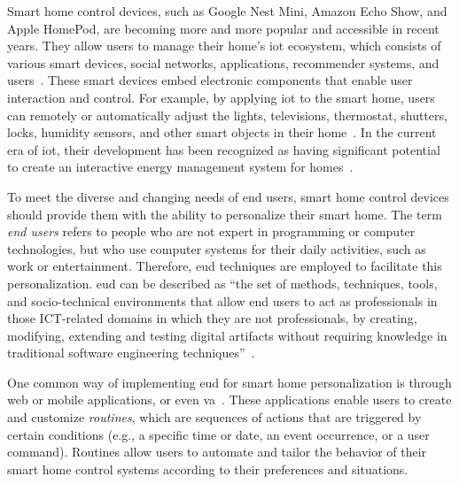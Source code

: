 Smart home control devices, such as Google Nest Mini, Amazon Echo Show, and Apple HomePod, are becoming more and more popular and accessible in recent years. They allow users to manage their home's \acrfull{iot} ecosystem, which consists of various smart devices, social networks, applications, recommender systems, and users~\parencite{barricelliDesigningEndUserDevelopment2015}. These smart devices embed electronic components that enable user interaction and control. For example, by applying \acrshort{iot} to the smart home, users can remotely or automatically adjust the lights, televisions, thermostat, shutters, locks, humidity sensors, and other smart objects in their home~\parencite{kortuemSmartObjectsBuilding2010,wuRespectChangeUser2017}. In the current era of \acrshort{iot}, their development has been recognized as having significant potential to create an interactive energy management system for homes~\parencite{graditiInnovativeControlLogics2015}.

To meet the diverse and changing needs of end users, smart home control devices should provide them with the ability to personalize their smart home. The term \textit{end users} refers to people who are not expert in programming or computer technologies, but who use computer systems for their daily activities, such as work or entertainment. Therefore, \acrfull{eud} techniques are employed to facilitate this personalization. \acrshort{eud} can be described as “the set of methods, techniques, tools, and socio-technical environments that allow end users to act as professionals in those ICT-related domains in which they are not professionals, by creating, modifying, extending and testing digital artifacts without requiring knowledge in traditional software engineering techniques”~\parencite{barricelliEnduserDevelopmentEnduser2019}.

One common way of implementing \acrshort{eud} for smart home personalization is through web or mobile applications, or even \acrfull{va}~\parencite{barricelliVirtualAssistantsPersonalizing2021,arditoSmartObjectsSmart2018}. These applications enable users to create and customize \textit{routines}, which are sequences of actions that are triggered by certain conditions (e.g., a specific time or date, an event occurrence, or a user command). Routines allow users to automate and tailor the behavior of their smart home control systems according to their preferences and situations.

